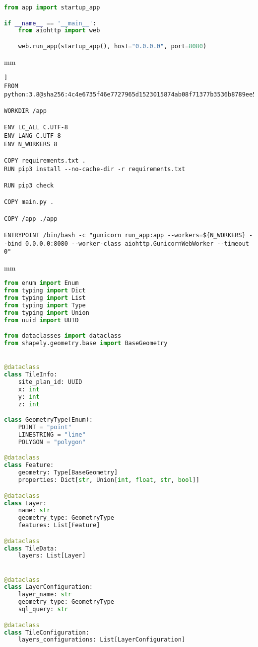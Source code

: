 \begin{lstlisting}[language=Python, caption=main.py, captionpos=b]
from app import startup_app

if __name__ == '__main__':
    from aiohttp import web

    web.run_app(startup_app(), host="0.0.0.0", port=8080)
\end{lstlisting}
 mm
\begin{lstlisting}[caption=Dockerfile, captionpos=b]]
FROM python:3.8@sha256:4c4e6735f46e7727965d1523015874ab08f71377b3536b8789ee5742fc737059

WORKDIR /app

ENV LC_ALL C.UTF-8
ENV LANG C.UTF-8
ENV N_WORKERS 8

COPY requirements.txt .
RUN pip3 install --no-cache-dir -r requirements.txt

RUN pip3 check

COPY main.py .

COPY /app ./app

ENTRYPOINT /bin/bash -c "gunicorn run_app:app --workers=${N_WORKERS} --bind 0.0.0.0:8080 --worker-class aiohttp.GunicornWebWorker --timeout 0"
\end{lstlisting}
 mm
\begin{lstlisting}[language=Python, caption=domain/model.py, captionpos=b]
from enum import Enum
from typing import Dict
from typing import List
from typing import Type
from typing import Union
from uuid import UUID

from dataclasses import dataclass
from shapely.geometry.base import BaseGeometry


@dataclass
class TileInfo:
    site_plan_id: UUID
    x: int
    y: int
    z: int

class GeometryType(Enum):
    POINT = "point"
    LINESTRING = "line"
    POLYGON = "polygon"

@dataclass
class Feature:
    geometry: Type[BaseGeometry]
    properties: Dict[str, Union[int, float, str, bool]]

@dataclass
class Layer:
    name: str
    geometry_type: GeometryType
    features: List[Feature]

@dataclass
class TileData:
    layers: List[Layer]


@dataclass
class LayerConfiguration:
    layer_name: str
    geometry_type: GeometryType
    sql_query: str

@dataclass
class TileConfiguration:
    layers_configurations: List[LayerConfiguration]
\end{lstlisting}

